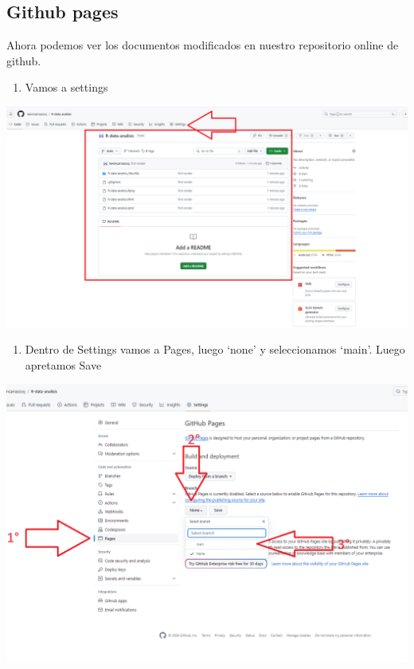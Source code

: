 \documentclass[
  letterpaper,
  DIV=11,
  numbers=noendperiod]{scrartcl}
\providecommand{\tightlist}{%
  \setlength{\itemsep}{0pt}\setlength{\parskip}{0pt}}\usepackage{longtable,booktabs,array}
\begin{document}
\subsection{Github pages}\label{github-pages}

Ahora podemos ver los documentos modificados en nuestro repositorio
online de github.

\begin{enumerate}
\def\labelenumi{\arabic{enumi}.}
\setcounter{enumi}{6}
\tightlist
\item
  Vamos a settings
\end{enumerate}

\includegraphics{images/pages.png}

\begin{enumerate}
\def\labelenumi{\arabic{enumi}.}
\setcounter{enumi}{7}
\tightlist
\item
  Dentro de Settings vamos a Pages, luego `none' y seleccionamos `main'.
  Luego apretamos Save
\end{enumerate}

\includegraphics{images/pages2.png}
\end{document}
